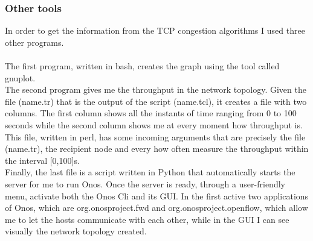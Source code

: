{{{\subsubsection{Other tools}{
In order to get the information from the TCP congestion algorithms I used three other programs.\\\\
The first program, written in bash, creates the graph using the tool called gnuplot.\\The second program gives me the throughput in the network topology. Given the file (name.tr) that is the output of the script (name.tcl), it creates a file with two columns.  The first column shows all the instants of time ranging from 0 to 100 seconds while the second column shows me at every moment how throughput is. This file, written in perl, has some incoming arguments that are precisely the file (name.tr), the recipient node and every how often measure the throughput within the interval [0,100]s.\\ Finally, the last file is a script written in Python that automatically starts the server for me to run Onos. Once the server is ready, through a user-friendly menu, activate both the Onos Cli and its GUI. In the first active two applications of Onos, which are org.onosproject.fwd and org.onosproject.openflow, which allow me to let the hosts communicate with each other, while in the GUI I can see visually the network topology created. }
}
}}
